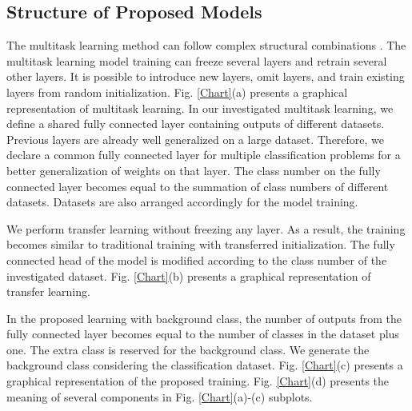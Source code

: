 \documentclass{article}
\begin{document}
\subsection{Structure of Proposed Models}
The multitask learning method can follow complex structural combinations \cite{gesmundo2022evolutionary}. The multitask learning model training can freeze several layers and retrain several other layers. It is possible to introduce new layers, omit layers, and train existing layers from random initialization. Fig. \ref{Chart}(a) presents a graphical representation of multitask learning. In our investigated multitask learning, we define a shared fully connected layer containing outputs of different datasets. Previous layers are already well generalized on a large dataset.  Therefore, we declare a common fully connected layer for multiple classification problems for a better generalization of weights on that layer.
The class number on the fully connected layer becomes equal to the summation of class numbers of different datasets. Datasets are also arranged accordingly for the model training.

We perform transfer learning without freezing any layer. As a result, the training becomes similar to traditional training with transferred initialization. The fully connected head of the model is modified according to the class number of the investigated dataset. Fig. \ref{Chart}(b) presents a graphical representation of transfer learning.

In the proposed learning with background class, the number of outputs from the fully connected layer becomes equal to the number of classes in the dataset plus one. The extra class is reserved for the background class. We generate the background class considering the classification dataset. Fig. \ref{Chart}(c) presents a graphical representation of the proposed training. Fig. \ref{Chart}(d) presents the meaning of several components in Fig. \ref{Chart}(a)-(c) subplots.
\end{document}
